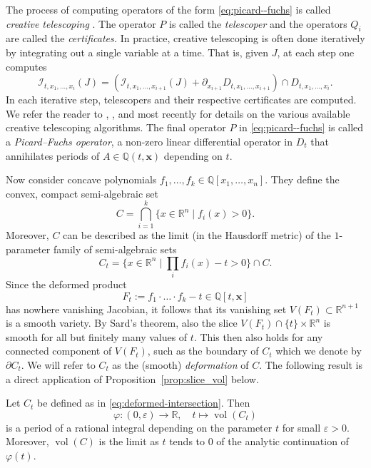 \documentclass[sigconf, nonacm]{acmart} %
\DeclareMathOperator{\vol}{vol}
\begin{document}
The process of computing operators of the form \eqref{eq:picard--fuchs} is called {\em{creative telescoping}} \cite{ZEILBERGER1990321}. The operator $P$ is called the {\em telescoper} and the operators $Q_i$ are called the {\em certificates.} In practice, creative telescoping is often done iteratively by integrating out a single variable at a time. That is, given $J$, at each step one computes
\begin{equation}
    \mathcal I_{t, x_1, \dots, x_i}(J) = (\mathcal I_{t,x_1, \dots, x_{i+1}}(J) + \partial_{x_{i+1}}D_{t, x_1, \dots, x_{i+1}}) \cap D_{t, x_1, \dots, x_{i}}.
\end{equation}
In each iterative step, telescopers and their respective certificates are computed. 
We refer the reader to \cite[Sec. 5.4]{KauersDfinite}, \cite{chyzak:tel-01069831}, and most recently \cite{brochet2025fastermultivariateintegrationdmodules} for details on the various available creative telescoping algorithms.  
The final operator $P$ in \eqref{eq:picard--fuchs} is called a {\em{Picard--Fuchs operator}}, a non-zero linear differential operator in $D_t$ that annihilates periods of $A \in \mathbb{Q}(t,\mathbf{x})$ depending on $t$.


Now consider concave polynomials $f_1, \dots, f_k \in \mathbb Q[x_1, \dots, x_n]$. They define the convex, compact semi-algebraic set
\begin{equation}
    C  = \bigcap_{i=1}^k\{x \in \mathbb R^n \mid f_i(x) >0\}.
\end{equation}
Moreover, $C$ can be described as the limit (in the Hausdorff metric) of the $1$-parameter family of semi-algebraic sets
\begin{equation}\label{eq:deformed-intersection}
    C_t = \{x \in \mathbb R^n \mid \prod_i f_i(x) -t > 0 \} \cap C. 
\end{equation}
Since the deformed product
\begin{equation}\label{eq:deformed_product}
    F_t := f_1\cdot\ldots \cdot f_k -t \in \mathbb{Q}[t, \mathbf{x}]
\end{equation}
has nowhere vanishing Jacobian, it follows that its vanishing set $V(F_t) \subset \mathbb{R}^{n+1}$ is a  smooth variety. By Sard's theorem, also the slice $V(F_t) \cap \{t\}\times \mathbb{R}^n$ is smooth for all but finitely many values of $t$. This then also holds for any connected component of $V(F_t)$, such as the boundary of $C_t$ which we denote by $\partial C_t$. We will refer to $C_t$ as the (smooth) {\em deformation} of $C$. The following result is a direct application of Proposition~\ref{prop:slice_vol} below. 
\begin{proposition}
    \label{prop:slice_volumes_as_periods}
    Let $C_t$ be defined as in \eqref{eq:deformed-intersection}. Then 
    \begin{equation}
    \varphi : (0, \varepsilon) \to \mathbb{R}, \quad t\mapsto\vol(C_t)
\end{equation}
is a period of a rational integral depending on the parameter $t$ for small $\varepsilon>0$. Moreover, $\vol(C)$ is the limit as $t$ tends to $0$ of the analytic continuation of $\varphi(t)$.
\end{proposition}
\end{document}
